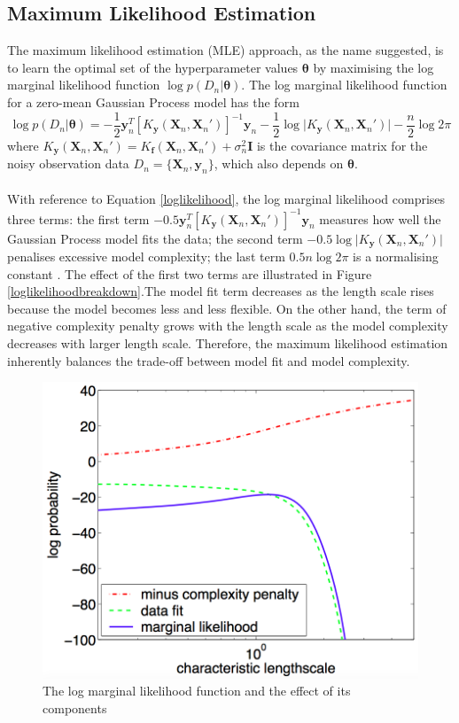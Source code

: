 \documentclass[a4paper,11pt]{report}
\begin{document}
\subsection{Maximum Likelihood Estimation}
The maximum likelihood estimation (MLE) approach, as the name suggested, is to learn the optimal set of the hyperparameter values $\boldsymbol{\theta}$ by maximising the log marginal likelihood function $\log p( D_n \vert \boldsymbol{\theta})$. The log marginal likelihood function for a zero-mean Gaussian Process model has the form
 	\begin{equation} \label{loglikelihood}
 	\log p( D_n \vert \boldsymbol{\theta}) = -\frac{1}{2} \mathbf{y}_n^T [K_{\mathbf{y}} (\mathbf{X}_n,\mathbf{X}_n') ]^{-1} \mathbf{y}_n - \frac{1}{2} \log \vert K_{\mathbf{y}} (\mathbf{X}_n,\mathbf{X}_n') \vert - \frac{n}{2} \log 2\pi 
 	\end{equation}
where $ K_{\mathbf{y}} (\mathbf{X}_n,\mathbf{X}_n') = K_{\mathbf{f}} (\mathbf{X}_n,\mathbf{X}_n') + \sigma_{n}^2 \mathbf{I}$ is the covariance matrix for the noisy observation data $D_n=\{ \mathbf{X}_n,\mathbf{y}_n\}$, which also depends on $\boldsymbol{\theta}$. 
\\\\
With reference to Equation \ref{loglikelihood}, the log marginal likelihood comprises three terms: the first term $- 0.5 \mathbf{y}_n^T [K_{\mathbf{y}} (\mathbf{X}_n,\mathbf{X}_n') ]^{-1} \mathbf{y}_n $ measures how well the Gaussian Process model fits the data; the second term $- 0.5 \log \vert K_{\mathbf{y}} (\mathbf{X}_n,\mathbf{X}_n') \vert $ penalises excessive model complexity; the last term $ 0.5 n \log 2\pi $ is a normalising constant \cite{rasmussen2006gaussian}. The effect 
of the first two terms are illustrated in Figure \ref{loglikelihoodbreakdown}.The model fit term decreases as the length scale rises because the model becomes less and less flexible. On the other hand, the term of negative complexity penalty grows with the length scale as the model complexity decreases with larger length scale. Therefore, the maximum likelihood estimation inherently balances the trade-off between model fit and model complexity. 
\\
\begin{figure} [H]
	\label{logml}
	\centering
	 \includegraphics[width=0.5\linewidth]{loglikelihoodbreakdown.png}
\caption{ The log marginal likelihood function and the effect of its components\cite{rasmussen2006gaussian}  }
\end{figure}
\end{document}
